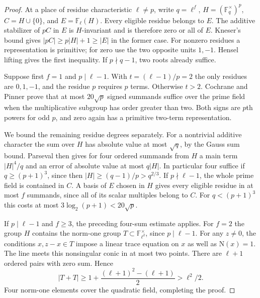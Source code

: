 \documentclass[11pt,letterpaper]{article}
\theoremstyle{definition}
\numberwithin{equation}{section}
\begin{document}
\begin{proof}
At a place of residue characteristic $\ell\ne p$, write $q=\ell^f$,
$H=(\mathbb F_q^\times)^p$, $C=H\cup\{0\}$, and $E=\mathbb F_\ell(H)$.
Every eligible residue belongs to $E$. The additive stabilizer of
$pC$ in $E$ is $H$-invariant and is therefore zero or all of $E$.
Kneser's bound \cite{edkneser} gives $|pC|\ge p|H|+1\ge |E|$
in the former case. For nonzero residues a representation is
primitive; for zero use the two opposite units $1,-1$. Hensel
lifting gives the first inequality. If $p\nmid q-1$, two roots
already suffice.

Suppose first $f=1$ and $p\mid\ell-1$. With $t=(\ell-1)/p=2$
the only residues are $0,1,-1$, and the residue $p$ requires $p$
terms. Otherwise $t>2$. Cochrane and Pinner
\cite[Corollary~10.3]{hprimeCP} prove that at most $20\sqrt p$
signed summands suffice over the prime field when the multiplicative
subgroup has order greater than two. Both signs are $p$th powers
for odd $p$, and zero again has a primitive two-term representation.

We bound the remaining residue degrees separately. For a nontrivial
additive character the sum over $H$ has absolute value at most
$\sqrt q$, by the Gauss sum bound. Parseval then gives for four
ordered summands from $H$ a main term $|H|^4/q$ and an error of
absolute value at most $q|H|$. In particular four suffice if
$q\ge(p+1)^3$, since then $|H|\ge(q-1)/p>q^{2/3}$.
If $p\nmid\ell-1$, the whole prime field is contained in $C$.
A basis of $E$ chosen in $H$ gives every eligible residue in at
most $f$ summands, since all of its scalar multiples belong to $C$.
For $q<(p+1)^3$ this costs at most $3\log_2(p+1)<20\sqrt p$.

If $p\mid\ell-1$ and $f\ge3$, the preceding four-sum estimate
applies. For $f=2$ the group $H$ contains the norm-one group
$T\subset\mathbb F_{\ell^2}^\times$, since $p\mid\ell-1$.
For any $z\ne0$, the conditions $x,z-x\in T$ impose a linear
trace equation on $x$ as well as $\mathrm N(x)=1$. The line
meets this nonsingular conic in at most two points. There are
$\ell+1$ ordered pairs with zero sum. Hence
\[
    |T+T|\ge 1+\frac{(\ell+1)^2-(\ell+1)}2>\ell^2/2.
\]
Four norm-one elements cover the quadratic field, completing the proof.
\end{proof}
\end{document}
